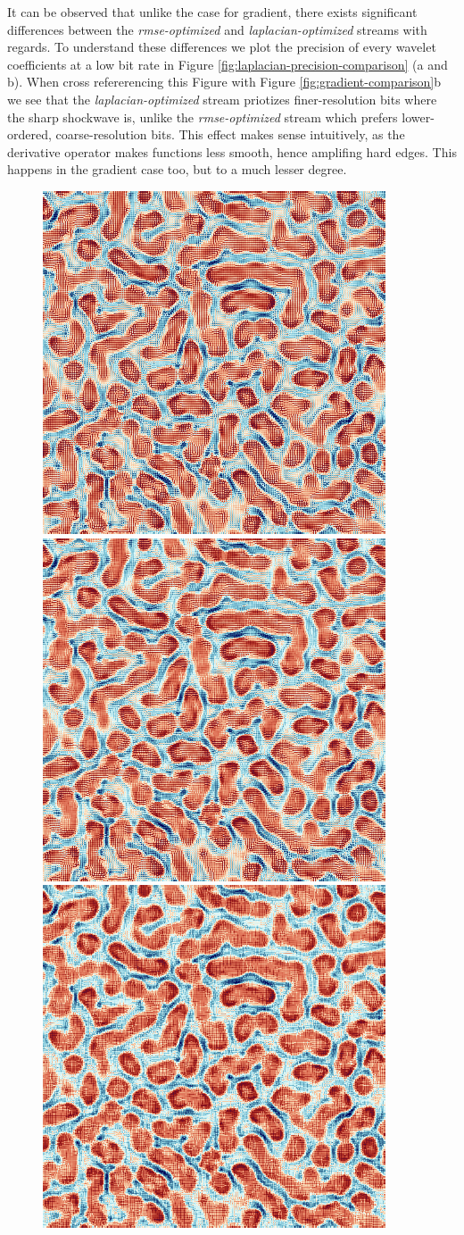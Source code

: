 It can be observed that unlike the case for gradient, there exists significant differences between
the \emph{rmse-optimized} and \emph{laplacian-optimized} streams with regards. To understand these
differences we plot the precision of every wavelet coefficients at a low bit rate in Figure
\ref{fig:laplacian-precision-comparison} (a and b). When cross refererencing this Figure with Figure
\ref{fig:gradient-comparison}b we see that the \emph{laplacian-optimized} stream priotizes
finer-resolution bits where the sharp shockwave is, unlike the \emph{rmse-optimized} stream which
prefers lower-ordered, coarse-resolution bits. This effect makes sense intuitively, as the
derivative operator makes functions less smooth, hence amplifing hard edges. This happens in the
gradient case too, but to a much lesser degree.

\begin{figure}[h]
	\centering
	{\includegraphics[width=0.32\linewidth]{img/laplacian/laplacian_0.png}}
	{\includegraphics[width=0.32\linewidth]{img/laplacian/laplacian_1.png}}
	{\includegraphics[width=0.32\linewidth]{img/laplacian/laplacian_2.png}}

\end{figure}
